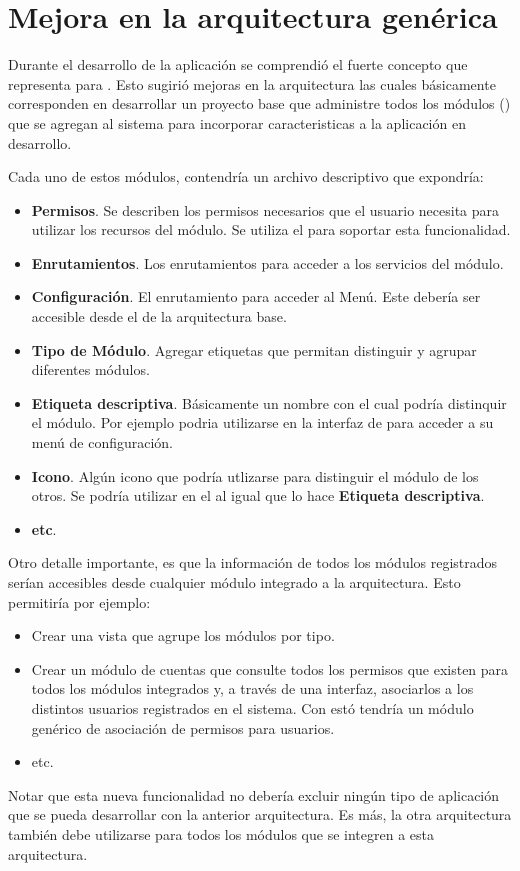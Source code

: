 
\section{Mejora en la arquitectura genérica}

	Durante el desarrollo de la aplicación se comprendió el fuerte concepto que representa \packageAS para \meteorNAME. Esto sugirió mejoras en la arquitectura las cuales básicamente corresponden en desarrollar un proyecto base que administre todos los módulos (\packageAS) que se agregan al sistema para incorporar caracteristicas a la aplicación en desarrollo. 

	Cada uno de estos módulos, contendría un archivo descriptivo que expondría:
	\begin{itemize}
		\item
			\textbf{Permisos}. Se describen los permisos necesarios que el usuario necesita para utilizar los recursos del módulo. Se utiliza el \packageAS \alanningRolesPackage para soportar esta funcionalidad.
		\item
			\textbf{Enrutamientos}. Los enrutamientos para acceder a los servicios del módulo.
		\item
			\textbf{Configuración}. El enrutamiento para acceder al Menú. Este debería ser accesible desde el \dashboardEF  de la arquitectura base.
		\item
			\textbf{Tipo de Módulo}. Agregar etiquetas que permitan distinguir y agrupar diferentes módulos.
		\item
			\textbf{Etiqueta descriptiva}. Básicamente un nombre con el cual podría distinquir el módulo. Por ejemplo podria utilizarse en la interfaz de \dashboardEF para acceder a su menú de configuración.
		\item
			\textbf{Icono}. Algún icono que podría utlizarse para distinguir el módulo de los otros. Se podría utilizar en el \dashboardEF al igual que lo hace \textbf{Etiqueta descriptiva}.
		\item
			\textbf{etc}.
	\end{itemize}


	Otro detalle importante, es que la información de todos los módulos registrados serían accesibles desde cualquier módulo integrado a la arquitectura. Esto permitiría por ejemplo:

	\begin{itemize}
		\item
			Crear una vista que agrupe los módulos por tipo.
		\item
			Crear un módulo de cuentas que consulte todos los permisos que existen para todos los módulos integrados y, a través de una interfaz, asociarlos a los distintos usuarios registrados en el sistema. Con estó tendría un módulo genérico de asociación de permisos para usuarios.
		\item
			etc.
	\end{itemize}

	Notar que esta nueva funcionalidad no debería excluir ningún tipo de aplicación que se pueda desarrollar con la anterior arquitectura. Es más, la otra arquitectura también debe utilizarse para todos los módulos que se integren a esta arquitectura.

